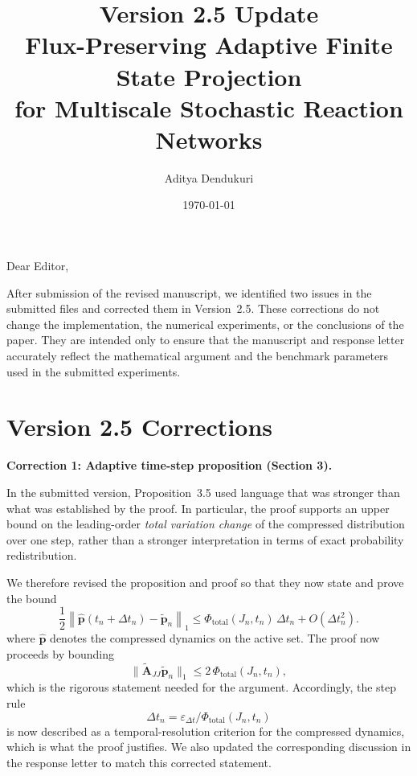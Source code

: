 \documentclass[11pt]{article}
\title{\textbf{Version 2.5 Update}\\[0.5em]
\large Flux-Preserving Adaptive Finite State Projection\\
for Multiscale Stochastic Reaction Networks}
\author{Aditya Dendukuri}
\date{\today}
\begin{document}
\maketitle

\noindent Dear Editor,

\medskip

After submission of the revised manuscript, we identified two issues in the submitted files and corrected them in Version~2.5. These corrections do not change the implementation, the numerical experiments, or the conclusions of the paper. They are intended only to ensure that the manuscript and response letter accurately reflect the mathematical argument and the benchmark parameters used in the submitted experiments.

\medskip

\section*{Version 2.5 Corrections}

\noindent\textbf{Correction 1: Adaptive time-step proposition (Section 3).}

In the submitted version, Proposition~3.5 used language that was stronger than what was established by the proof. In particular, the proof supports an upper bound on the leading-order \emph{total variation change} of the compressed distribution over one step, rather than a stronger interpretation in terms of exact probability redistribution.

We therefore revised the proposition and proof so that they now state and prove the bound
\[
\frac{1}{2}\left\|\widehat{\boldsymbol{p}}(t_n+\Delta t_n)-\widetilde{\boldsymbol{p}}_n\right\|_1
\leq
\Phi_{\mathrm{total}}(J_n,t_n)\,\Delta t_n + O(\Delta t_n^2).
\]
where $\widehat{\boldsymbol{p}}$ denotes the compressed dynamics on the active set. The proof now proceeds by bounding
\[
\|\widetilde{\mathbf{A}}_{JJ}\widetilde{\boldsymbol{p}}_n\|_1
\le 2\,\Phi_{\mathrm{total}}(J_n,t_n),
\]
which is the rigorous statement needed for the argument. Accordingly, the step rule
\[
\Delta t_n = \varepsilon_{\Delta t}/\Phi_{\mathrm{total}}(J_n,t_n)
\]
is now described as a temporal-resolution criterion for the compressed dynamics, which is what the proof justifies. We also updated the corresponding discussion in the response letter to match this corrected statement.
\end{document}
